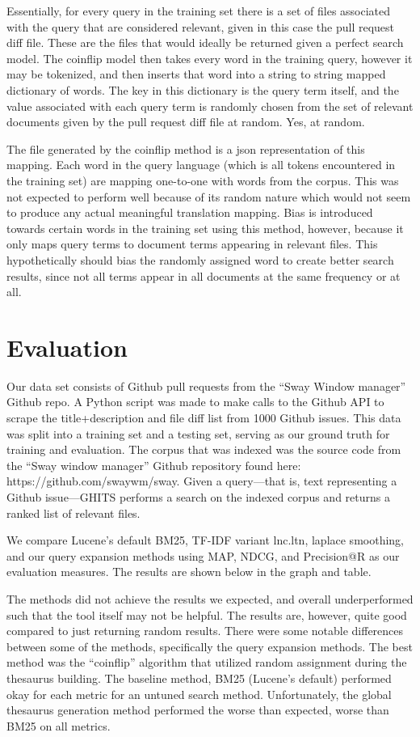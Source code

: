 \documentclass[10pt,a4paper]{article}
\begin{document}
Essentially, for every query in the training set there is a set of files
associated with the query that are considered relevant, given in this case the
pull request diff file. These are the files that would ideally be returned given
a perfect search model. The coinflip model then takes every word in the training
query, however it may be tokenized, and then inserts that word into a string to
string mapped dictionary of words. The key in this dictionary is the query term
itself, and the value associated with each query term is randomly chosen from the
set of relevant documents given by the pull request diff file at random. Yes, at
random.

The file generated by the coinflip method is a json representation of this mapping.
Each word in the query language (which is all tokens encountered in the training set)
are mapping one-to-one with words from the corpus. This was not expected to perform
well because of its random nature which would not seem to produce any
actual meaningful translation mapping. Bias is introduced towards certain words
in the training set using this method, however, because it only maps query terms
to document terms appearing in relevant files. This hypothetically should bias
the randomly assigned word to create better search results, since not all terms
appear in all documents at the same frequency or at all.

\section{Evaluation}

Our data set consists of Github pull requests from the “Sway Window manager” Github repo. A Python script was made to make calls to the Github API to scrape the title+description and file diff list from 1000 Github issues. This data was split into a training set and a testing set, serving as our ground truth for training and evaluation. The corpus that was indexed was the source code from the “Sway window manager” Github repository found here: https://github.com/swaywm/sway. Given a query—that is, text representing a Github issue—GHITS performs a search on the indexed corpus and returns a ranked list of relevant files.

We compare Lucene’s default BM25, TF-IDF variant lnc.ltn, laplace smoothing, and our query expansion methods using MAP, NDCG, and Precision@R as our evaluation measures. The results are shown below in the graph and table. 

The methods did not achieve the results we expected, and overall underperformed such that the tool itself may not be helpful. The results are, however, quite good compared to just returning random results.  There were some notable differences between some of the methods, specifically the query expansion methods. The best method was the “coinflip” algorithm that utilized random assignment during the thesaurus building. The baseline method, BM25 (Lucene’s default) performed okay for each metric for an untuned search method. Unfortunately, the global thesaurus generation method performed the worse than expected, worse than BM25 on all metrics.
\end{document}
